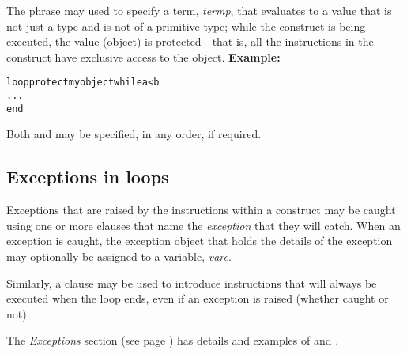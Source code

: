 The  phrase may used to specify a term,
\emph{termp}, that evaluates to a value that is not just a type and
is not of a primitive type;
while the  construct is being executed, the value (object)
is protected - that is, all the instructions in the 
construct have exclusive access to the object.
 \textbf{Example:}
\begin{alltt}
loop protect myobject while a<b
  ...
  end
\end{alltt}
 
Both  and  may be specified, in any order,
if required.
\subsection{Exceptions in loops}
 
Exceptions that are raised by the instructions within a 
construct may be caught using one or more  clauses that
name the \emph{exception} that they will catch.  When an exception is
caught, the exception object that holds the details of the exception may
optionally be assigned to a variable, \emph{vare}.
 
Similarly, a  clause may be used to introduce
instructions that will always be executed when the loop ends, even if an
exception is raised (whether caught or not).
 
The  \emph{Exceptions} section (see page \pageref{refexcep})  has details and
examples of  and .
